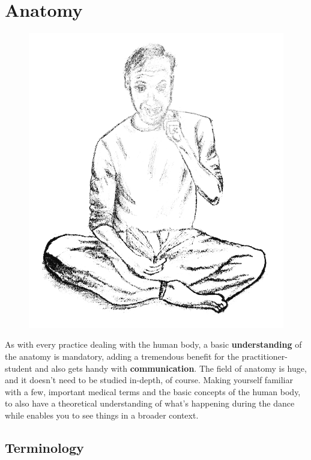 \chapter{Anatomy}\label{ch:anatomy}

\begin{figure}[h]
    \begin{center}
    {\includegraphics[width=0.3\paperwidth]{images/testpic}}
    \end{center}\label{img:anatomy}
\end{figure}

As with every practice dealing with the human body, a basic \textbf{understanding} of the anatomy is mandatory, adding a tremendous benefit for the practitioner-student and also gets handy with \textbf{communication}.
The field of anatomy is huge, and it doesn't need to be studied in-depth, of course.
Making yourself familiar with a few, important medical terms and the basic concepts of the human body, to also have a theoretical understanding of what's happening during the dance while enables you to see things in a broader context.

\section{Terminology}\label{sec:terminology}

